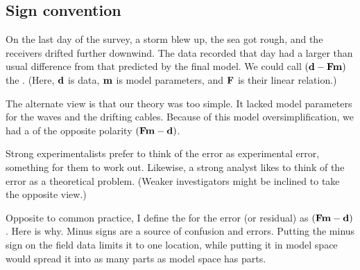 \subsection{Sign convention}
On the last day of the survey, a storm blew up,
the sea got rough, and the receivers drifted further downwind.
The data recorded that day
had a larger than usual difference
from that predicted by the final model.
We could call
$(\bold d-\bold F\bold m)$
the {\it {}}.
(Here,
$\bold d$ is data,
$\bold m$ is model parameters, and
$\bold F$ is their linear relation.)

\par
The alternate view is that our theory was too simple.
It lacked model parameters for the waves and the drifting cables.
Because of this model oversimplification,
we had a {\it {}} of the opposite polarity
$(\bold F\bold m-\bold d)$.
\par
Strong experimentalists prefer to think of the error
as experimental error, something for them to work out.
Likewise, a strong analyst likes to think
of the error as a theoretical problem.
(Weaker investigators might be inclined to take the opposite view.)

\par
Opposite to common practice,
I define the  for the error (or residual) as
$(\bold F\bold m-\bold d)$.
Here is why.
Minus signs are a source of confusion and errors.
Putting the minus sign on the field data limits it to one location,
while putting it in model space would spread it into as many parts
as model space has parts.

\begin{comment}
So in this book
we see positive signs on operators
and we see residuals initialized by the negative of the data,
often with subroutine \texttt{negcopy()}.
\progdex{negcopy}{copy and negate}
\end{comment}
\par
{}
\par

